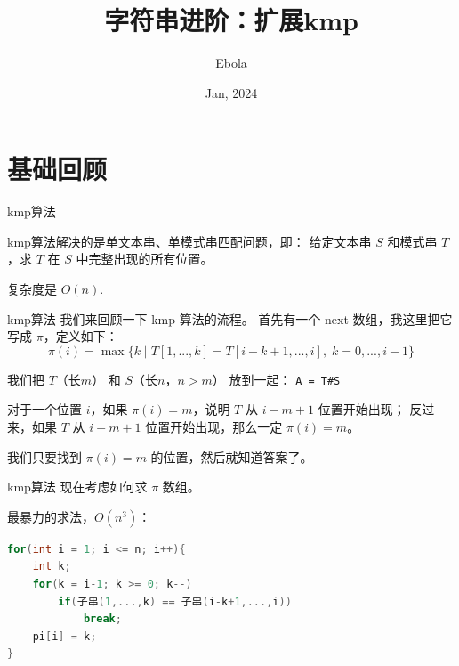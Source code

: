 \documentclass{beamer}
\author{Ebola}
\title{字符串进阶：扩展kmp}
\institute{
    Institute of Mathematics, \\
    Zhejiang University.
}
\date{Jan, 2024}
\begin{document}
\begin{frame}
    \titlepage
\end{frame}

\begin{frame}
    \tableofcontents[sectionstyle=show,subsectionstyle=show/shaded/hide,subsubsectionstyle=show/shaded/hide]
\end{frame}

\section{基础回顾}

\begin{frame}{kmp算法}
    \small

    kmp算法解决的是单文本串、单模式串匹配问题，即：
    给定文本串 $S$ 和模式串 $T$，求 $T$ 在 $S$ 中完整出现的所有位置。

    \vspace{1em}
    复杂度是 $O(n)$.
\end{frame}

\begin{frame}[fragile]{kmp算法}
    \footnotesize
    我们来回顾一下 kmp 算法的流程。
    首先有一个 next 数组，我这里把它写成 $\pi$，定义如下：
    \begin{equation*}
        \pi(i)=\max \{k\;|\; T[1,...,k]=T[i-k+1,...,i],\; k=0,...,i-1\}
    \end{equation*}

    \vspace{1em}\pause
    我们把 $T$（长$m$） 和 $S$（长$n$，$n>m$） 放到一起：
    \verb|A = T#S|
    
    \vspace{1em}
    对于一个位置 $i$，如果 $\pi(i)=m$，说明 $T$ 从 $i-m+1$ 位置开始出现；
    反过来，如果 $T$ 从 $i-m+1$ 位置开始出现，那么一定 $\pi(i)=m$。
    
    \vspace{1em}
    我们只要找到 $\pi(i)=m$ 的位置，然后就知道答案了。
\end{frame}

\begin{frame}[fragile]{kmp算法}
    \footnotesize
    现在考虑如何求 $\pi$ 数组。

    最暴力的求法，$O(n^3)$：

    \begin{lstlisting}[language=c++]
for(int i = 1; i <= n; i++){
    int k;
    for(k = i-1; k >= 0; k--)
        if(子串(1,...,k) == 子串(i-k+1,...,i))
            break;
    pi[i] = k;
}
    \end{lstlisting}
\end{frame}
\end{document}
